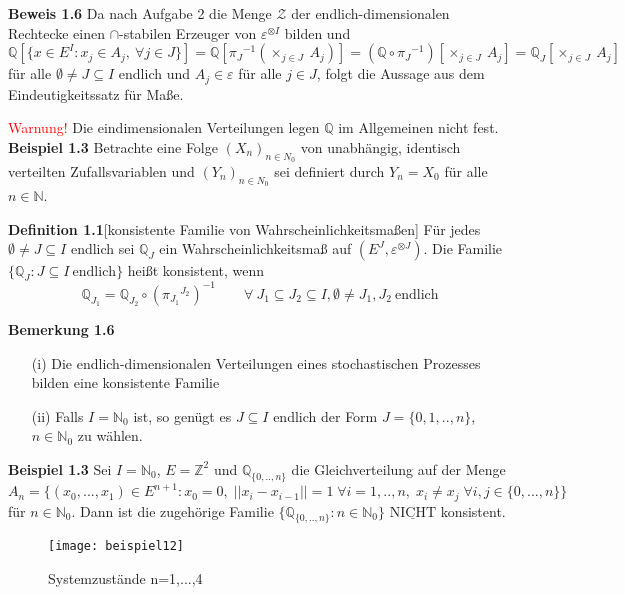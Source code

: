 \textbf{Beweis 1.6}
Da nach Aufgabe 2 die Menge $\mathcal{Z}$ der endlich-dimensionalen Rechtecke einen $\cap$-stabilen Erzeuger von $\varepsilon^{ \otimes I}$ bilden und
\begin{equation*}
\mathbb{Q}[\lbrace x \in E^{I} : x_{j} \in A_{j}, \: \forall j \in J\rbrace] = \mathbb{Q}[{\pi_{J}}^{-1}(\times_{j \in J} \: A_{j})] = (\mathbb{Q} \circ {\pi_{J}}^{-1})[\times_{j \in J} \: A_{j}] = \mathbb{Q}_{J}[\times_{j \in J} \: A_{j}]  
\end{equation*}
für alle $\emptyset \neq J \subseteq I$ endlich und $A_{j} \in \varepsilon$ für alle $j \in J$, folgt die Aussage aus dem Eindeutigkeitssatz für Maße. 

\noindent
\textcolor{red}{Warnung!} Die eindimensionalen Verteilungen legen $\mathbb{Q}$ im Allgemeinen nicht fest.
\textbf{Beispiel 1.3}
Betrachte eine Folge ${(X_{n})}_{n \in N_{0}}$ von unabhängig, identisch verteilten Zufallsvariablen und ${(Y_{n})}_{n \in N_{0}}$ sei definiert durch $Y_{n} = X_{0}$ für alle $n \in \mathbb{N}$.

\textbf{Definition 1.1}[konsistente Familie von Wahrscheinlichkeitsmaßen]
Für jedes $\emptyset \neq J \subseteq I$ endlich sei $\mathbb{Q}_{J}$ ein Wahrscheinlichkeitsmaß auf $(E^{J},\varepsilon^{ \otimes J})$. Die Familie $\lbrace \mathbb{Q}_{J} : J \subseteq I \: \mathrm{endlich}\rbrace$ heißt konsistent, wenn
\begin{equation*}
\mathbb{Q}_{J_{1}} = {\mathbb{Q}}_{J_{2}} \circ {({\pi_{J_{1}}}^{J_{2}})}^{-1} \qquad \forall \: J_{1} \subseteq J_{2} \subseteq I, \emptyset \neq J_{1},J_{2} \: \mathrm{endlich}
\end{equation*}

\textbf{Bemerkung 1.6}
\mbox{}
\begin{itemize}
\item[(i)] Die endlich-dimensionalen Verteilungen eines stochastischen Prozesses bilden eine konsistente Familie
\item[(ii)] Falls $I = \mathbb{N}_{0}$ ist, so genügt es $J \subseteq I $ endlich der Form $ J = \lbrace 0,1,..,n \rbrace$, $n \in \mathbb{N}_{0}$ zu wählen.
\end{itemize}

\textbf{Beispiel 1.3}
Sei $I = \mathbb{N}_{0}$, $E = \mathbb{Z}^{2}$ und $\mathbb{Q}_{\lbrace 0,..,n \rbrace}$ die Gleichverteilung auf der Menge
\begin{equation*}
A_{n} = \lbrace (x_{0},...,x_{1}) \in E^{n+1} : x_{0} = 0, \; ||{x_{i} - x_{i-1}}|| = 1  \; \forall i = 1,..,n,\; x_{i} \neq x_{j} \; \forall i,j \in \lbrace 0,...,n \rbrace \rbrace
\end{equation*}
für $n \in \mathbb{N}_{0}$. Dann ist die zugehörige Familie $\lbrace \mathbb{Q}_{\lbrace 0,..,n \rbrace} : n \in \mathbb{N}_{0} \rbrace$ $\underline{\mathrm{NICHT}}$ konsistent.
\begin{figure}[H]
\texttt{[image: beispiel12]}
\caption{Systemzustände n=1,...,4}
\end{figure}

